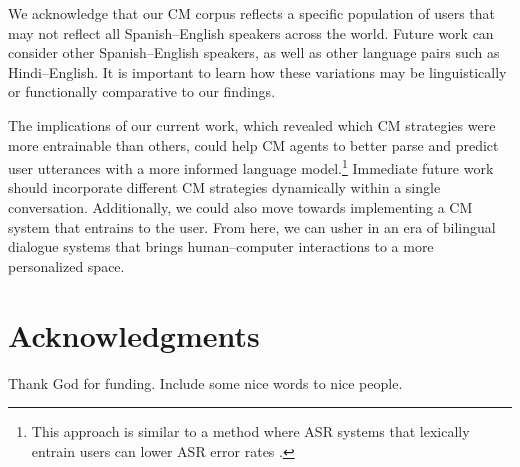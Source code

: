 \documentclass[11pt,a4paper]{article}
\newcommand{\ea}[1]{\textcolor{blue}{\bf\small [#1 --EA]}}
\begin{document}
We acknowledge that our CM corpus reflects a specific population of users that may not reflect all Spanish--English speakers across the world.
Future work can consider other Spanish--English speakers, as well as other language pairs such as Hindi--English.
It is important to learn how these variations may be linguistically or functionally comparative to our findings.



The implications of our current work, which revealed which CM strategies were more entrainable than others, could help CM agents to better parse and predict user utterances with a more informed language model.\footnote{This approach is similar to a method where ASR systems that lexically entrain users can lower ASR error rates \citep{levitan2013entrainment}.}
Immediate future work should incorporate different CM strategies dynamically within a single conversation.
Additionally, we could also move towards implementing a CM system that entrains to the user.
From here, we can usher in an era of bilingual dialogue systems that brings human--computer interactions to a more personalized space.




\iftaclfinal

\section{Acknowledgments}
Thank God for funding. Include some nice words to nice people.
\else
\fi



\end{document}
